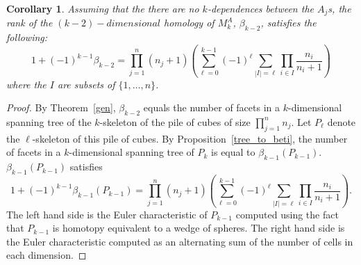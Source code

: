 \documentclass{amsart}
\newtheorem{cor}[theorem]{Corollary}
\begin{document}
\begin{cor}
Assuming that the there are no $k$-dependences between the $A_j$s, the rank of the $(k-2)-dimensional$ homology of $M^A_k$, $\beta_{k-2}$, satisfies the following:
\[1+(-1)^{k-1} \beta_{k-2} = \prod_{j=1}^n{(n_j+1)} \left(\sum_{\ell=0}^{k-1} (-1)^\ell \sum_{|I|=\ell}\prod_{i\in I}\frac{n_i}{n_i+1}   \right)\]
where the $I$ are subsets of $\{1, \dots, n\}$.
\end{cor}

\begin{proof}
By Theorem~\ref{gen}, $\beta_{k-2}$ equals the number of facets in a $k$-dimensional spanning tree of the $k$-skeleton of the pile of cubes of size $\prod_{j=1}^n n_j$. Let $P_{\ell}$ denote the $\ell$-skeleton of this pile of cubes.
By Proposition~\ref{tree_to_beti}, the number of facets in a $k$-dimensional spanning tree of $P_k$ is equal to $\beta_{k-1}(P_{k-1})$. $\beta_{k-1}(P_{k-1})$ satisfies
\[1+(-1)^{k-1} \beta_{k-1}(P_{k-1}) = \prod_{j=1}^n{(n_j+1)} \left(\sum_{\ell=0}^{k-1} (-1)^\ell \sum_{|I|=\ell}\prod_{i\in I}\frac{n_i}{n_i+1}   \right).\]
The left hand side is the Euler characteristic of $P_{k-1}$ computed using the fact that $P_{k-1}$ is homotopy equivalent to a wedge of spheres. The right hand side is the Euler characteristic computed as an alternating sum of the number of cells in each dimension.
\end{proof}




\end{document}
